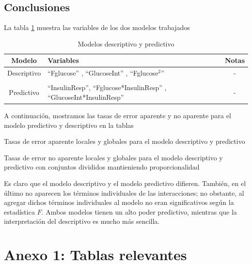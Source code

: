 \documentclass[11pt]{article}
\begin{document}
\subsection{Conclusiones}
La tabla \ref{3-models} muestra las variables de los dos modelos trabajados
\begin{table}[H]
    \centering
    \begin{tabular}{c|p{4cm}|c}
        Modelo & Variables & Notas \\
        \hline
        Descriptivo &``Fglucose'' , ``GlucoseInt'' , ``Fglucose$^{2}$'' & - \\ 
          & & \\
        Predictivo & ``InsulinResp'', ``Fglucose*InsulinResp'' , ``GlucoseInt*InsulinResp'' & - \\
    \end{tabular}
    \caption{Modelos descriptivo y predictivo}
    \label{3-models}
\end{table}
A continuación, mostramos las tasas de error aparente y no aparente para el modelo predictivo y descriptivo en la tablas

\begin{table}[H]
    \caption{Tasas de error aparente locales y globales para el modelo descriptivo y predictivo}
    \label{3-final-aparent-err}
\end{table}

\begin{table}[H]
    \caption{Tasas de error no aparente locales y globales para el modelo descriptivo y predictivo con conjuntos divididos mantieniendo proporcionalidad}
    \label{3-final-nonaparent-err}
\end{table}
Es claro que el modelo descriptivo y el modelo predictivo difieren. También, en el último no aparecen los términos individuales de las interacciones; no obstante, al agregar dichos términos individuales al modelo no eran significativos según la estadística $F$. Ambos modelos tienen un alto poder predictivo, mientras que la interpretación del descriptivo es mucho más sencilla.
\pagebreak
\section*{Anexo 1: Tablas relevantes}
\end{document}
